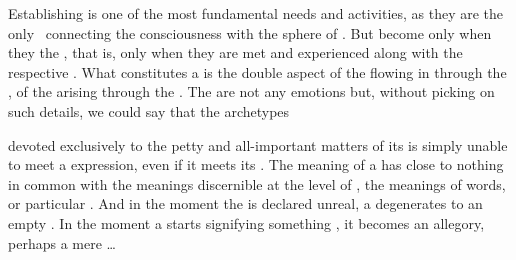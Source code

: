 Establishing  is one of the most fundamental needs and
{activities}, as they are the only \rss\ connecting the 
consciousness with the sphere of .  But
 become  only when they 
the , that is, only when they are met and experienced
along with the respective \oss.  What constitutes a  is the
double aspect of the  flowing in through the , of the
 arising through the . The  are
not any emotions but, without picking on such details, we could say that the
archetypes 

 devoted exclusively to the petty and all-important matters of
its  is simply unable to meet a  expression, even if
it meets its . The meaning of a  has close to
nothing in common with the meanings discernible at the level of ,
the meanings of  words,  or particular
. And in the moment the  is declared
unreal, a  degenerates to an empty .  In the moment a
 starts signifying something , it becomes an allegory,
perhaps a mere  \ldots

